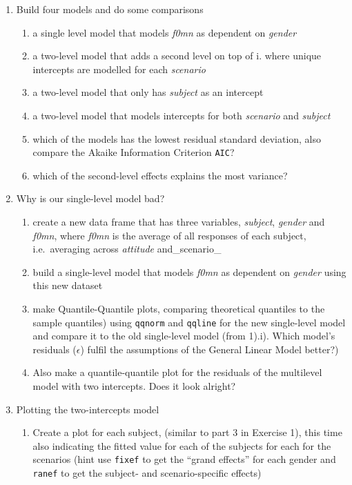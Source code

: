 \documentclass[
]{article}
\providecommand{\tightlist}{%
  \setlength{\itemsep}{0pt}\setlength{\parskip}{0pt}}
\begin{document}
\begin{enumerate}
\def\labelenumi{\arabic{enumi})}
\tightlist
\item
  Build four models and do some comparisons

  \begin{enumerate}
  \def\labelenumii{\roman{enumii}.}
  \tightlist
  \item
    a single level model that models \emph{f0mn} as dependent on
    \emph{gender}
  \item
    a two-level model that adds a second level on top of i. where unique
    intercepts are modelled for each \emph{scenario}
  \item
    a two-level model that only has \emph{subject} as an intercept
  \item
    a two-level model that models intercepts for both \emph{scenario}
    and \emph{subject}
  \item
    which of the models has the lowest residual standard deviation, also
    compare the Akaike Information Criterion \texttt{AIC}?
  \item
    which of the second-level effects explains the most variance?
  \end{enumerate}
\item
  Why is our single-level model bad?

  \begin{enumerate}
  \def\labelenumii{\roman{enumii}.}
  \tightlist
  \item
    create a new data frame that has three variables, \emph{subject},
    \emph{gender} and \emph{f0mn}, where \emph{f0mn} is the average of
    all responses of each subject, i.e.~averaging across \emph{attitude}
    and\_scenario\_
  \item
    build a single-level model that models \emph{f0mn} as dependent on
    \emph{gender} using this new dataset
  \item
    make Quantile-Quantile plots, comparing theoretical quantiles to the
    sample quantiles) using \texttt{qqnorm} and \texttt{qqline} for the
    new single-level model and compare it to the old single-level model
    (from 1).i). Which model's residuals (\(\epsilon\)) fulfil the
    assumptions of the General Linear Model better?)
  \item
    Also make a quantile-quantile plot for the residuals of the
    multilevel model with two intercepts. Does it look alright?
  \end{enumerate}
\item
  Plotting the two-intercepts model

  \begin{enumerate}
  \def\labelenumii{\roman{enumii}.}
  \tightlist
  \item
    Create a plot for each subject, (similar to part 3 in Exercise 1),
    this time also indicating the fitted value for each of the subjects
    for each for the scenarios (hint use \texttt{fixef} to get the
    ``grand effects'' for each gender and \texttt{ranef} to get the
    subject- and scenario-specific effects)
  \end{enumerate}
\end{enumerate}
\end{document}
